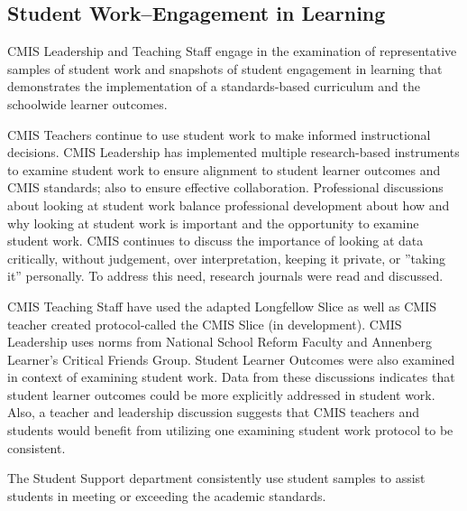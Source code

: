 \documentclass{report}
\begin{document}
\subsection{Student Work--Engagement in Learning}


\begin{findings}
CMIS Leadership and Teaching Staff engage in the examination of representative samples of student work and snapshots of student engagement in learning that demonstrates the implementation of a standards-based curriculum and the schoolwide learner outcomes.

CMIS Teachers continue to use student work to make informed instructional decisions. CMIS Leadership has implemented multiple research-based instruments to examine student work to ensure  alignment to student learner outcomes and CMIS standards; also to ensure effective collaboration. Professional discussions about looking at student work  balance professional development about how and why looking at student work is important and the opportunity to examine student work. CMIS continues to discuss the importance of looking at data critically, without judgement, over interpretation, keeping it private, or ”taking it” personally. To address this need, research journals were read and discussed. 

CMIS Teaching Staff have used the adapted Longfellow Slice as well as CMIS teacher created protocol-called the CMIS Slice (in development). CMIS Leadership uses norms from National School Reform Faculty and Annenberg Learner’s Critical Friends Group. Student Learner Outcomes were also examined in context of examining student work. Data from these discussions indicates that student learner outcomes could be more explicitly addressed in student work. Also, a teacher and leadership discussion suggests that CMIS teachers and students would benefit from utilizing one examining student work protocol to be consistent. 

The Student Support department consistently use student samples to assist students in meeting or exceeding the academic standards. 
\end{findings}
\end{document}
